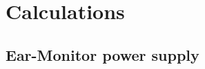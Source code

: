 \chapter{Calculations}
\label{Calculations}

\section{Ear-Monitor power supply}
\label{sec:Ear-Monitor power supply}